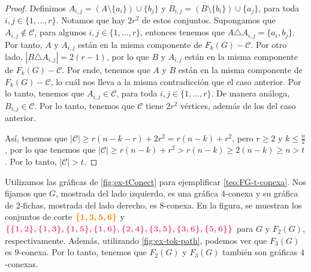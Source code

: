 \begin{proof}
Definimos $A_{i,j} = (A\setminus \{a_i\}) \cup \{b_j\}$ y $B_{i,j} = (B\setminus
\{b_i\}) \cup \{a_j\}$, para toda $ i, j \in \{1, \dots, r\}$. Notamos que hay
$2r^2$ de estos conjuntos. Supongamos que $A_{i,j} \notin \mathcal{C}$, para
algunos $ i, j \in \{1, \dots, r\}$, entonces tenemos que $A \triangle A_{i,j} =
\{a_i, b_j\}$. Por tanto, $A$ y $A_{i,j}$ est\'an en la misma componente de
$F_k(G)- \mathcal{C}$. Por otro lado, $|B \triangle A_{i,j}| = 2 (r-1)$, por lo
que $B$ y $A_{i,j}$ est\'an en la misma componente de $F_k(G) - \mathcal{C}$.
Por ende, tenemos que $A$ y $B$ est\'an en la misma componente de
$F_k(G)-\mathcal{C}$, lo cu\'al nos lleva a la misma contradicci\'on que el caso
anterior. Por lo tanto, tenemos que $A_{i,j} \in \mathcal{C}$, para toda $i, j
\in \{1, \dots, r\}$. De manera an\'aloga, $B_{i,j} \in \mathcal{C}$. Por lo
tanto, tenemos que $\mathcal{C}$ tiene $2r^2$ v\'ertices, adem\'as de los del
caso anterior.

As\'i, tenemos que $|\mathcal{C}|\geq r(n-k-r)+2r^2 = r(n-k) + r^2$, pero $r
\geq 2$ y $k \leq \frac{n}{2}$, por lo que tenemos que $|\mathcal{C}| \geq
r(n-k)+r^2 > r(n-k) \geq 2(n-k) \geq n >t$. Por lo tanto, $|\mathcal{C}|>t$.
\end{proof} 

Utilizamos las gr\'aficas de \cref{fig:ex-tConect} para ejemplificar
\cref{teo:FG-t-conexa}. Nos fijamos que $G$, mostrada del lado izquierdo, es una
gr\'afica $4$-conexa y su gr\'afica de $2$-fichas, mostrada del lado derecho, es
$8$-conexa. En la figura, se muestran los conjuntos de corte
${\color{naranja}\boldsymbol{ \{1,3,5,6\}}}$ y ${\color{fushia}\boldsymbol
{\{\{1,2\},\{1,3\},\{1,5\},\{1,6\},\{2,4\},\{3,5\},\{3,6\},\{5,6\}\}}}$ para $G$
y $F_2(G)$, respectivamente. Adem\'as, utilizando \cref{fig:ex-tok-path},
podemos ver que $F_3(G)$ es $9$-conexa. Por lo tanto, tenemos que $F_2(G)$ y
$F_3(G)$ tambi\'en son gr\'aficas $4$-conexas.

